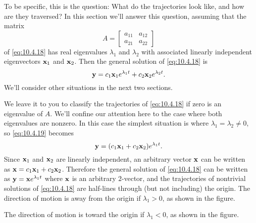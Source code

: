 \documentclass{ximera}
\begin{document}
To be specific, this is the question: What do the trajectories look
like, and how are they traversed? In this section we'll answer this
question, assuming that the matrix
$$
A=\begin{bmatrix}a_{11}&a_{12}\\a_{21}&a_{22}
\end{bmatrix}
$$
of \eqref{eq:10.4.18} has real eigenvalues $\lambda_1$ and $\lambda_2$ with
associated linearly independent eigenvectors ${\bf x}_1$ and ${\bf
x}_2$. Then  the general solution of \eqref{eq:10.4.18} is
\begin{equation} \label{eq:10.4.19}
{\bf y}= c_1{\bf x}_1
 e^{\lambda_1 t}+c_2{\bf x}_2e^{\lambda_2 t}.
\end{equation}
We'll consider other situations in the next two sections.

We leave it to you %
to classify the
trajectories of \eqref{eq:10.4.18} if zero is an eigenvalue of $A$. We'll
confine our attention here to the case where both eigenvalues are
nonzero. In this case the simplest situation is where
$\lambda_1=\lambda_2\neq 0$, so  \eqref{eq:10.4.19} becomes
$$
{\bf y}=(c_1{\bf x}_1+c_2{\bf x}_2)e^{\lambda_1 t}.
$$
Since ${\bf x}_1$ and
${\bf x}_2$ are linearly independent, an arbitrary vector ${\bf x}$
can be written as ${\bf x}=c_1{\bf x}_1+c_2{\bf x}_2$. Therefore the
general solution of \eqref{eq:10.4.18} can be written as ${\bf y}={\bf
x}e^{\lambda_1 t}$ where ${\bf x}$ is an arbitrary $2$-vector, and the
trajectories of nontrivial solutions of \eqref{eq:10.4.18} are half-lines
through (but not including) the origin. The direction of motion is
away from the origin if $\lambda_1>0$, as shown in the figure.

\begin{center}
\end{center}



The direction of motion is toward the origin if $\lambda_1<0$, as shown in the figure. 

\begin{center}
\end{center}
\end{document}
